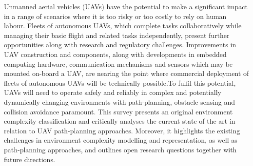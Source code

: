 \documentclass[11pt,epsf,times]{article}
\begin{document}
Unmanned aerial vehicles (UAVs) have the potential to make a significant impact in a range of scenarios where it is too risky or too costly to rely on human labour. Fleets of autonomous UAVs, which complete tasks collaboratively while managing their basic flight and related tasks independently, present further opportunities along with research and regulatory challenges. Improvements in UAV construction and components, along with developments in embedded computing hardware, communication mechanisms and sensors which may be mounted on-board a UAV, are nearing the point where commercial deployment of fleets of autonomous UAVs will be technically possible.To fulfil this potential, UAVs will need to operate safely and reliably in complex and potentially dynamically changing environments with path-planning, obstacle sensing and collision avoidance paramount. This survey presents an original environment complexity classification and critically analyses the current state of the art in relation to UAV path-planning approaches. Moreover, it highlights the existing challenges in environment complexity modelling and representation, as well as path-planning approaches, and outlines open research questions together with future directions. \cite{ACM2023}
\end{document}
